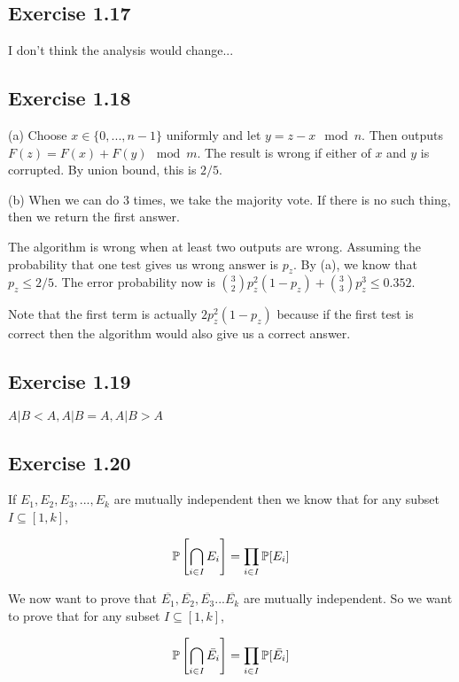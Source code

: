 \subsection*{Exercise 1.17}

I don't think the analysis would change...

\subsection*{Exercise 1.18}

\noindent (a) Choose $x \in \{0,...,n-1\}$ uniformly and let $y = z - x \mod n$. Then outputs $F(z) = F(x) + F(y) \mod m$. 
The result is wrong if either of $x$ and $y$ is corrupted. By union bound, this is $2/5$. 

\noindent (b) When we can do 3 times, we take the majority vote. If there is no such thing, then we return the first answer.

The algorithm is wrong when at least two outputs are wrong. Assuming the probability that one test gives us wrong answer is
$p_z$. By (a), we know that $p_z \leq 2/5$. The error probability now is $\binom{3}{2} p_z^2(1-p_z) + \binom{3}{3} p_z^3 \leq
0.352$.

Note that the first term is actually  $2p_z^2(1-p_z)$ because if the first test is correct then the algorithm would also give
us a correct answer.

\subsection*{Exercise 1.19}

$A | B < A, A | B = A, A | B > A$

\subsection*{Exercise 1.20}

If $E_1, E_2, E_3,...,E_k$ are mutually independent then we know that for any subset $I \subseteq [1,k]$,

\begin{equation*}
\P\left[\bigcap_{i\in I}E_i \right] = \prod_{i\in I}\P[E_i]
\end{equation*}

We now want to prove that $\overline{E_1}, \overline{E_2}, \overline{E_3}...\overline{E_k}$ are mutually independent.
So we want to prove that for any subset $I \subseteq [1,k]$,

\begin{equation*}
\begin{split}
\P\left[\bigcap_{i\in I}\bar{E_i} \right] = \prod_{i\in I}\P[\bar{E_i}] \\
\end{split}
\end{equation*}

